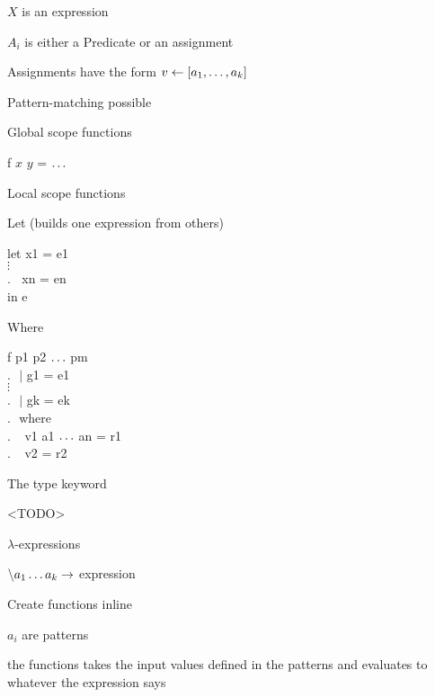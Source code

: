 			\item $X$ is an expression
			\item $A_i$ is either a Predicate or an assignment
			\item Assignments have the form $v \leftarrow [a_1, \mathellipsis, a_k]$
			\item Pattern-matching possible
		\enumend
		\item Global scope functions
		\enumstart
			\item f $x$ $y$ = $\mathellipsis$
		\enumend
		\item Local scope functions
		\enumstart
			\item Let (builds one expression from others)
			\enumstart
				\item let x1 = e1\\$\vdots$\\.$\ \ \ \ $xn = en\\in e
			\enumend
			\item Where
			\enumstart
				\item f p1 p2 $\mathellipsis$ pm\\.$\ \ \ |$ g1 = e1\\$\vdots$\\.$\ \ \ |$ gk = ek\\.$\ \ \ $where\\.$\ \ \ \ \ $v1 a1 $\mathellipsis$ an = r1\\.$\ \ \ \ \ $v2 = r2
			\enumend
		\enumend
		\item The type keyword
		\enumstart
			\item <TODO>
		\enumend
		\item $\lambda$-expressions
		\enumstart
			\item $\backslash a_1 \mathellipsis a_k \rightarrow$ expression
			\item Create functions inline
			\item $a_i$ are patterns
			\item the functions takes the input values defined in the patterns and evaluates to whatever the expression says
		\enumend
	\enumend
\enumend
